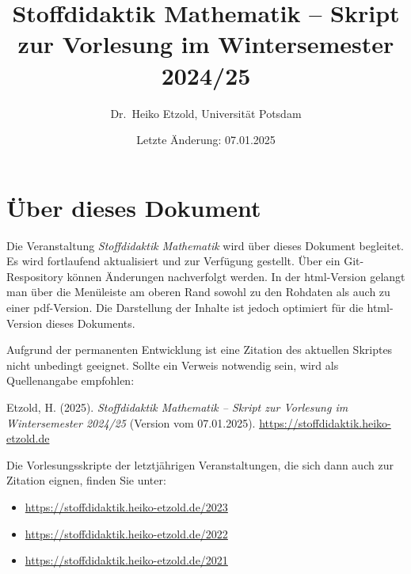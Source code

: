 \documentclass[
]{scrbook}
\title{Stoffdidaktik Mathematik -- Skript zur Vorlesung im Wintersemester 2024/25}
\author{Dr.~Heiko Etzold, Universität Potsdam}
\date{Letzte Änderung: 07.01.2025}
\makeatletter
\providecommand{\tightlist}{%
  \setlength{\itemsep}{0pt}\setlength{\parskip}{0pt}}
\renewenvironment{quote}{
  \list{}{
	\leftmargin0.2cm   %
    \rightmargin\leftmargin
      	\def\FrameCommand
    {%
        {\color{quoteColor}\vrule width 2pt}%
        \hspace{0pt}%
    }%
    \MakeFramed{\advance \hsize -\width \FrameRestore}    \color{quoteColor}
    }
  \item\relax
}
{\endlist\color{black}\endMakeFramed}
\def\renewtheorem#1{%
  \expandafter\let\csname#1\endcsname\relax
  \expandafter\let\csname c@#1\endcsname\relax
  \gdef\renewtheorem@envname{#1}
  \renewtheorem@secpar
}
\def\renewtheorem@secpar{\@ifnextchar[{\renewtheorem@numberedlike}{\renewtheorem@nonumberedlike}}
\def\renewtheorem@numberedlike[#1]#2{\newtheorem{\renewtheorem@envname}[#1]{#2}}
\def\renewtheorem@nonumberedlike#1{
\def\renewtheorem@caption{#1}
\edef\renewtheorem@nowithin{\noexpand\newtheorem{\renewtheorem@envname}{\renewtheorem@caption}}
\renewtheorem@thirdpar
}
\def\renewtheorem@thirdpar{\@ifnextchar[{\renewtheorem@within}{\renewtheorem@nowithin}}
\def\renewtheorem@within[#1]{\renewtheorem@nowithin[#1]}
\theoremstyle{definition}
\theoremstyle{definition}
\theoremstyle{definition}
\theoremstyle{definition}
\theoremstyle{remark}
\makeatother
\begin{document}
\maketitle

%

{
\hypersetup{linkcolor=}
\setcounter{tocdepth}{1}
\tableofcontents
}
\chapter*{Über dieses Dokument}\label{uxfcber-dieses-dokument}

Die Veranstaltung \emph{Stoffdidaktik Mathematik} wird über dieses Dokument begleitet. Es wird fortlaufend aktualisiert und zur Verfügung gestellt. Über ein Git-Respository können Änderungen nachverfolgt werden.
In der html-Version gelangt man über die Menüleiste am oberen Rand sowohl zu den Rohdaten als auch zu einer pdf-Version. Die Darstellung der Inhalte ist jedoch optimiert für die html-Version dieses Dokuments.

Aufgrund der permanenten Entwicklung ist eine Zitation des aktuellen Skriptes nicht unbedingt geeignet. Sollte ein Verweis notwendig sein, wird als Quellenangabe empfohlen:

\begin{quote}
Etzold, H. (2025). \emph{Stoffdidaktik Mathematik -- Skript zur Vorlesung im Wintersemester 2024/25} (Version vom 07.01.2025). \url{https://stoffdidaktik.heiko-etzold.de}
\end{quote}

Die Vorlesungsskripte der letztjährigen Veranstaltungen, die sich dann auch zur Zitation eignen, finden Sie unter:

\begin{itemize}
\tightlist
\item
  \url{https://stoffdidaktik.heiko-etzold.de/2023}
\item
  \url{https://stoffdidaktik.heiko-etzold.de/2022}
\item
  \url{https://stoffdidaktik.heiko-etzold.de/2021}
\end{itemize}
\end{document}
